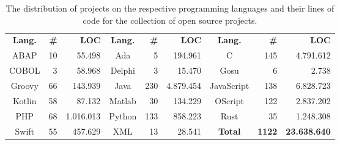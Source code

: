 \setlength{\extrarowheight}{.5em}
\begin{table}
	\caption[Overview over the open source projects.]{The distribution of projects on the respective programming languages and their lines of code for the collection of open source projects.}
	\label{table:gitProjects}
	\begin{tabularx}{\textwidth}{c|r|r|c|r|r|c|r|r}
		\textbf{Lang.} & \textbf{\#} & \textbf{LOC} &\textbf{Lang.} & \textbf{\#} & \textbf{LOC} &\textbf{Lang.} & \textbf{\#} & \textbf{LOC} \\
		ABAP & 10 & 55.498 &
		Ada & 5 & 194.961 &
		C & 145 & 4.791.612 \\
		COBOL & 3 & 58.968 &
		Delphi & 3 & 15.470 &
		Gosu & 6 & 2.738 \\
		Groovy & 66 & 143.939 &
		Java & 230 & 4.879.454 &
		JavaScript & 138 & 6.828.723 \\
		Kotlin & 58 & 87.132 &
		Matlab & 30 & 134.229 &
		OScript & 122 & 2.837.202 \\
		PHP & 68 & 1.016.013 &
		Python & 133 & 858.223 &
		Rust & 35 & 1.248.308 \\
		Swift & 55 & 457.629 &
		XML & 13 & 28.541 &
		\textbf{Total} & \textbf{1122} & \textbf{23.638.640}
		
	\end{tabularx}
\end{table}
\setlength{\extrarowheight}{0em}